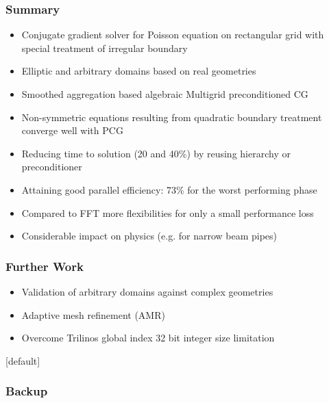 \documentclass[xcolor=pdftex,table,10pt]{beamer}
\begin{document}
    \begin{frame}
		\frametitle{Summary}

		\begin{itemize}
			\item Conjugate gradient solver for Poisson equation on rectangular grid with special treatment of irregular boundary
			\item Elliptic and arbitrary domains based on real geometries
			\item Smoothed aggregation based algebraic Multigrid preconditioned CG
            \item Non-symmetric equations resulting from quadratic boundary treatment converge well with PCG
            \item Reducing time to solution (20 and 40\%) by reusing hierarchy or preconditioner
            \item Attaining good parallel efficiency: 73\% for the worst performing phase
            \item Compared to FFT more flexibilities for only a small performance loss
            \item Considerable impact on physics (e.g. for narrow beam pipes)
		\end{itemize}

    \end{frame}

    \begin{frame}
        \frametitle{Further Work}

		\begin{itemize}
			\item Validation of arbitrary domains against complex geometries
			\item Adaptive mesh refinement (AMR)
            \item Overcome Trilinos global index 32 bit integer size limitation
		\end{itemize}

	\end{frame}

\addtocounter{framenumber}{-18}
[default]

	\begin{frame}
	  	\frametitle{Backup}
		\begin{center}
		\end{center}
	\end{frame}
    
\end{document}

